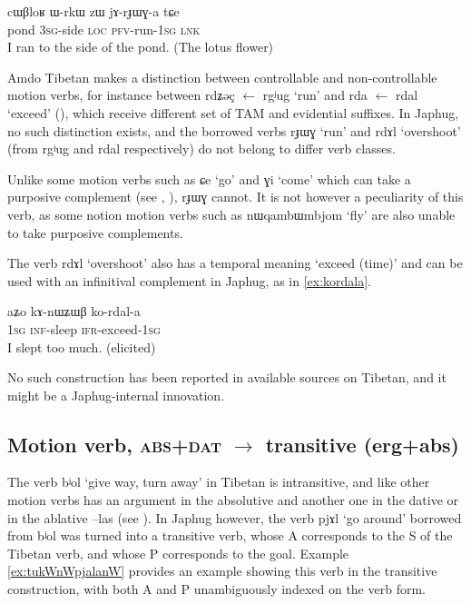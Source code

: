 \documentclass[oldfontcommands,oneside,a4paper,11pt]{article}
\newcommand{\ipa}[1]{{\phon \mbox{#1}}} %
\begin{document}
\begin{exe}
\ex \label{ex:rJWG3}
\gll
\ipa{cɯβloʁ}  	\ipa{ɯ-rkɯ}  	\ipa{zɯ}  	\ipa{jɤ-rɟɯɣ-a}  	\ipa{tɕe}  \\
pond \textsc{3sg}-side \textsc{loc} \textsc{pfv}-run-\textsc{1sg} \textsc{lnk} \\
\glt I ran to the side of the pond. (The lotus flower)
\end{exe}

Amdo Tibetan makes a distinction between controllable and non-controllable motion verbs, for instance between \ipa{rdʑəç} $\leftarrow$ \ipa{rgʲug} `run' and \ipa{rda} $\leftarrow$ \ipa{rdal} `exceed' (\citealt[123:543]{haller04themchen}), which receive different set of TAM and evidential suffixes. In Japhug, no such distinction exists, and  the borrowed verbs \ipa{rɟɯɣ} `run' and \ipa{rdɤl} `overshoot' (from \ipa{rgʲug} and \ipa{rdal} respectively) do not belong to differ verb classes.


Unlike some motion verbs such as \ipa{ɕe} `go' and \ipa{ɣi} `come' which can take a purposive complement (see \citealt{sun12complementation}, \citealt{jacques13harmonization}), \ipa{rɟɯɣ} cannot. It is not however a peculiarity of this verb, as some notion motion verbs such as \ipa{nɯqambɯmbjom} `fly' are also unable to take purposive complements.

The verb \ipa{rdɤl} `overshoot' also has a temporal meaning `exceed (time)' and can be used with an infinitival complement in Japhug, as in \ref{ex:kordala}.

\begin{exe}
\ex \label{ex:kordala}
\gll
\ipa{aʑo}  	\ipa{kɤ-nɯʑɯβ}  	\ipa{ko-rdal-a}  \\
\textsc{1sg} \textsc{inf}-sleep \textsc{ifr}-exceed-\textsc{1sg} \\
\glt I slept too much. (elicited)
\end{exe}

No such construction has been reported in available sources on Tibetan, and it might be a Japhug-internal innovation.

\subsection{Motion verb, \textsc{abs+dat} $\rightarrow$ transitive (erg+abs)}  
The verb \ipa{bʲol} `give way, turn away' in Tibetan is intransitive, and like other motion verbs has an argument in the absolutive and another one in the dative or in the ablative \ipa{--las} (see \citealt[268]{hill10dictionary}). In Japhug however, the verb \ipa{pjɤl} `go around' borrowed from  \ipa{bʲol} was turned into a transitive verb, whose A corresponds to the S of the Tibetan verb, and whose P corresponds to the goal. Example \ref{ex:tukWnWpjalanW} provides an example  showing this verb in the transitive construction, with both A and P unambiguously indexed on the verb form.
\end{document}
